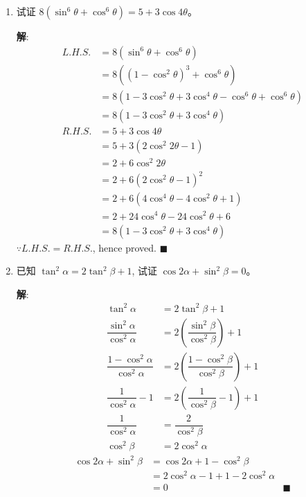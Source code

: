\documentclass{report}
\newcommand{\sol}{\vspace{0.2cm}\textbf{解}:}
\begin{document}
\begin{enumerate}[leftmargin=*]
        \item 试证 $8\left(\sin ^6 \theta+\cos ^6 \theta\right)=5+3 \cos 4 \theta$。
        
        \sol{}
        \begin{align*}
            L.H.S. &= 8\left(\sin ^6 \theta+\cos ^6 \theta\right) \\
            &= 8\left((1-\cos^2\theta)^3 + \cos^6\theta\right)\\
            &= 8(1 - 3\cos^2\theta + 3\cos^4\theta - \cos^6\theta + \cos^6\theta)\\
            &= 8(1 - 3\cos^2\theta + 3\cos^4\theta)\\
            R.H.S. &= 5 + 3\cos 4\theta \\
            &= 5 + 3(2\cos^2 2\theta - 1)\\
            &= 2 + 6\cos^2 2\theta\\
            &= 2 + 6(2\cos^2\theta - 1)^2\\
            &= 2 + 6(4\cos^4\theta - 4\cos^2\theta + 1)\\
            &= 2 + 24\cos^4\theta - 24\cos^2\theta + 6\\
            &= 8(1 - 3\cos^2\theta + 3\cos^4\theta)
        \end{align*}
        $\because L.H.S. = R.H.S.$, hence proved. \hfill $\blacksquare$

        \item 已知 $\tan ^2 \alpha=2 \tan ^2 \beta+1$, 试证 $\cos 2 \alpha+\sin ^2 \beta=0$。
        
        \sol{}
        \begin{align*}
            \tan^2\alpha &= 2\tan^2\beta + 1\\
            \dfrac{\sin^2\alpha}{\cos^2\alpha} &= 2\left(\dfrac{\sin^2\beta}{\cos^2\beta}\right) + 1\\
            \dfrac{1-\cos^2\alpha}{\cos^2\alpha} &= 2\left(\dfrac{1-\cos^2\beta}{\cos^2\beta}\right) + 1\\
            \dfrac{1}{\cos^2\alpha} - 1 &= 2\left(\dfrac{1}{\cos^2\beta} - 1\right) + 1\\
            \dfrac{1}{\cos^2\alpha} &= \dfrac{2}{\cos^2\beta}\\
            \cos^2\beta &= 2\cos^2\alpha
        \end{align*}
        \begin{align*}
            \cos 2\alpha + \sin^2\beta &= \cos 2\alpha + 1 - \cos^2\beta\\
            &= 2\cos^2\alpha - 1 + 1 - 2\cos^2\alpha\\
            &= 0 & \blacksquare
        \end{align*}


\end{enumerate}
\end{document}
